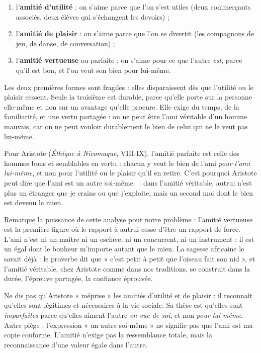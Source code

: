 \documentclass[11pt]{article}
\begin{document}
\begin{enumerate}
\item l'\textbf{amitié d'utilité} : on s'aime parce que l'on s'est utiles (deux commerçants associés, deux élèves qui s'échangent les devoirs) ;
\item l'\textbf{amitié de plaisir} : on s'aime parce que l'on se divertit (les compagnons de jeu, de danse, de conversation) ;
\item l'\textbf{amitié vertueuse} ou parfaite : on s'aime pour ce que l'autre \emph{est}, parce qu'il est bon, et l'on veut son bien pour lui-même.
\end{enumerate}

Les deux premières formes sont fragiles : elles disparaissent dès que l'utilité ou le plaisir cessent. Seule la troisième est durable, parce qu'elle porte sur la personne elle-même et non sur un avantage qu'elle procure. Elle exige du temps, de la familiarité, et une vertu partagée : on ne peut être l'ami véritable d'un homme mauvais, car on ne peut vouloir durablement le bien de celui qui ne le veut pas lui-même.

\begin{propriete}
Pour Aristote (\emph{Éthique à Nicomaque}, VIII-IX), l'amitié parfaite est celle des hommes bons et semblables en vertu : chacun y veut le bien de l'ami \emph{pour l'ami lui-même}, et non pour l'utilité ou le plaisir qu'il en retire. C'est pourquoi Aristote peut dire que l'ami est \guillemotleft un autre soi-même \guillemotright\ : dans l'amitié véritable, autrui n'est plus un étranger que je crains ou que j'exploite, mais un second moi dont le bien est devenu le mien.
\end{propriete}

Remarque la puissance de cette analyse pour notre problème : l'amitié vertueuse est la première figure où le rapport à autrui cesse d'être un rapport de force. L'ami n'est ni un maître ni un esclave, ni un concurrent, ni un instrument : il est un égal dont le bonheur m'importe autant que le mien. La sagesse africaine le savait déjà : le proverbe dit que « c'est petit à petit que l'oiseau fait son nid », et l'amitié véritable, chez Aristote comme dans nos traditions, se construit dans la durée, l'épreuve partagée, la confiance éprouvée.

\begin{attention}
Ne dis pas qu'Aristote « méprise » les amitiés d'utilité et de plaisir : il reconnaît qu'elles sont légitimes et nécessaires à la vie sociale. Sa thèse est qu'elles sont \emph{imparfaites} parce qu'elles aiment l'autre \emph{en vue de soi}, et non \emph{pour lui-même}. Autre piège : l'expression « un autre soi-même » ne signifie pas que l'ami est ma copie conforme. L'amitié n'exige pas la ressemblance totale, mais la reconnaissance d'une valeur égale dans l'autre.
\end{attention}
\end{document}
